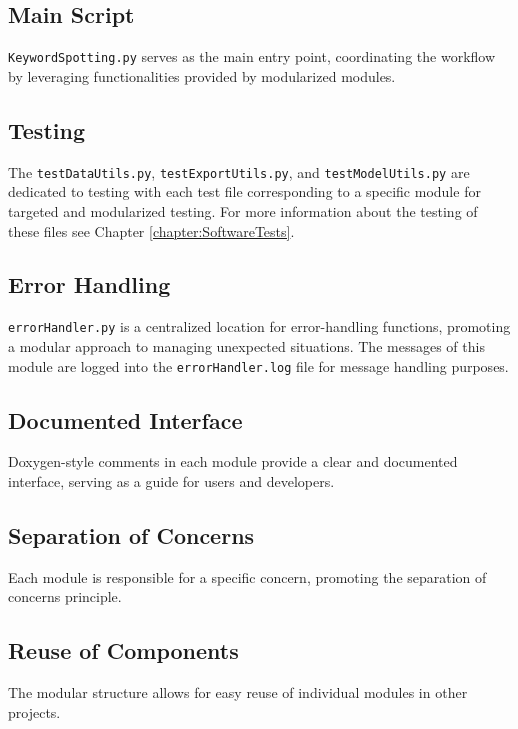 \subsection{Main Script}

\texttt{KeywordSpotting.py} serves as the main entry point, coordinating the workflow by leveraging functionalities provided by modularized modules.

\subsection{Testing}

The \texttt{testDataUtils.py}, \texttt{testExportUtils.py}, and \texttt{testModelUtils.py} are dedicated to testing with each test file corresponding to a specific module for targeted and modularized testing. For more information about the testing of these files see Chapter \ref{chapter:SoftwareTests}.

\subsection{Error Handling}

\texttt{errorHandler.py} is a centralized location for error-handling functions, promoting a modular approach to managing unexpected situations. The messages of this module are logged into the \texttt{errorHandler.log} file for message handling purposes.

\subsection{Documented Interface}

Doxygen-style comments in each module provide a clear and documented interface, serving as a guide for users and developers.

\subsection{Separation of Concerns}

Each module is responsible for a specific concern, promoting the separation of concerns principle.

\subsection{Reuse of Components}

The modular structure allows for easy reuse of individual modules in other projects.

